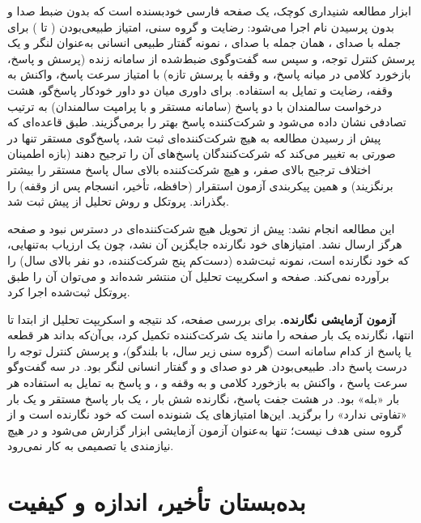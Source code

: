 ابزار مطالعه شنیداری کوچک، یک صفحه فارسی خودبسنده است که بدون ضبط صدا و
بدون پرسیدن نام اجرا می‌شود: رضایت و گروه سنی، امتیاز طبیعی‌بودن ( تا
) برای  جمله با صدای ، همان  جمله با صدای
،  نمونه گفتار طبیعی انسانی به‌عنوان لنگر و یک پرسش
کنترل توجه، و سپس سه گفت‌وگوی ضبط‌شده از سامانه زنده (پرسش و پاسخ، بازخورد
کلامی در میانه پاسخ، و وقفه با پرسش تازه) با امتیاز سرعت پاسخ، واکنش به
وقفه، رضایت و تمایل به استفاده. برای داوری میان دو داور خودکار پاسخ‌گو، هشت
درخواست سالمندان با دو پاسخ (سامانه مستقر و  با پرامپت سالمندان)
به ترتیب تصادفی نشان داده می‌شود و شرکت‌کننده پاسخ بهتر را برمی‌گزیند. طبق
قاعده‌ای که پیش از رسیدن مطالعه به هیچ شرکت‌کننده‌ای ثبت شد، پاسخ‌گوی مستقر تنها در صورتی به 
تغییر می‌کند که شرکت‌کنندگان پاسخ‌های آن را ترجیح دهند (بازه اطمینان اختلاف
ترجیح بالای صفر، و هیچ شرکت‌کننده بالای  سال پاسخ مستقر را بیشتر برنگزیند)
و همین پیکربندی آزمون استقرار (حافظه، تأخیر، انسجام پس از وقفه) را بگذراند.
پروتکل و روش تحلیل از پیش ثبت شد.

این مطالعه انجام نشد: پیش از تحویل هیچ شرکت‌کننده‌ای در دسترس نبود و صفحه
هرگز ارسال نشد. امتیازهای خود نگارنده جایگزین آن نشد، چون یک ارزیاب به‌تنهایی، که
خود نگارنده است، نمونه ثبت‌شده (دست‌کم پنج شرکت‌کننده، دو نفر بالای 
سال) را برآورده نمی‌کند. صفحه و اسکریپت تحلیل
آن منتشر شده‌اند و می‌توان آن را طبق پروتکل ثبت‌شده اجرا کرد.

\textbf{آزمون آزمایشی نگارنده.} برای بررسی صفحه، کد نتیجه و اسکریپت تحلیل از
ابتدا تا انتها، نگارنده یک بار صفحه را مانند یک شرکت‌کننده تکمیل کرد، بی‌آن‌که
بداند هر قطعه یا پاسخ از کدام سامانه است (گروه سنی زیر  سال، با بلندگو)،
و پرسش کنترل توجه را درست پاسخ داد. طبیعی‌بودن هر دو صدای  و
  و گفتار انسانی لنگر  بود. در سه گفت‌وگو سرعت
پاسخ ، واکنش به بازخورد کلامی و به وقفه  و ، و پاسخ به تمایل به
استفاده هر بار «بله» بود. در هشت جفت پاسخ، نگارنده شش بار ، یک
بار پاسخ مستقر و یک بار «تفاوتی ندارد» را برگزید. این‌ها امتیازهای یک شنونده
است که خود نگارنده است و از گروه سنی هدف نیست؛ تنها به‌عنوان آزمون آزمایشی
ابزار گزارش می‌شود و در هیچ نیازمندی یا تصمیمی به کار نمی‌رود.


\section{بده‌بستان تأخیر، اندازه و کیفیت}
\label{sec:res-tradeoff}

